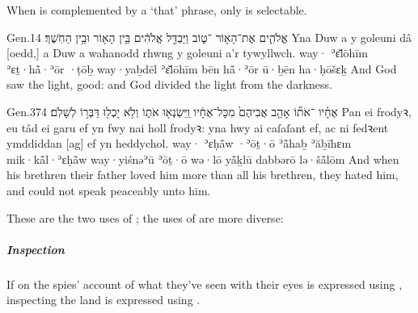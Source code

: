 
\begin{paper}
	{\click} When  is complemented by a  ‘that’ phrase, only  is selectable.
\end{paper}

\begin{example}{Gen.}{1}{4}{}{}
	\quoling
	{ אֱלֹהִ֛ים אֶת־הָא֖וֹר ־ט֑וֹב וַיַּבְדֵּ֣ל אֱלֹהִ֔ים בֵּ֥ין הָא֖וֹר וּבֵ֥ין הַחֹֽשֶׁךְ׃}
	{Yna Duw a  y goleuni  dâ [oedd,] a Duw a wahanodd rhwng y goleuni a’r tywyllwch.}
	{way· ʾɛ̆lōhīm ʾɛṯ·hå̄·ʾōr ·ṭōḇ way·yaḇdēl ʾɛ̆lōhīm bēn hå̄·ʾōr ū·ḇēn ha·ḥōšɛḵ}
	{And God saw the light,   good: and God divided the light from the darkness.}
\end{example}

\begin{example}{Gen.}{37}{4}{}{}
	\quoling
	{ אֶחָ֗יו ־אֹת֞וֹ אָהַ֤ב אֲבִיהֶם֙ מִכָּל־אֶחָ֔יו וַֽיִּשְׂנְא֖וּ אֹת֑וֹ וְלֹ֥א יָכְל֖וּ דַּבְּר֥וֹ לְשָׁלֹֽם׃}
	{Pan  ei frodyꝛ,  eu tâd  ei garu ef yn fwy nai holl frodyꝛ: yna hwy ai caſaſant ef, ac ni fedꝛent ymddiddan [ag] ef yn heddychol.}
	{way· ʾɛḥå̄w ·ʾōṯ·ō ʾå̄haḇ ʾăḇīhɛm mik·kå̄l·ʾɛḥå̄w way·yiśnəʾū ʾōṯ·ō wə·lō yå̄ḵlū dabbərō lə·šå̄lōm}
	{And when his brethren   their father loved him more than all his brethren, they hated him, and could not speak peaceably unto him.}
\end{example}

\begin{paper}
	{\click}{\click} These are the two uses of ; the uses of  are more diverse:
\end{paper}



\paragraph{}

\subparagraph{Inspection}

\begin{paper}
	If on  the spies’ account of what they’ve seen with their eyes is expressed using , inspecting the land is expressed using .
\end{paper}

